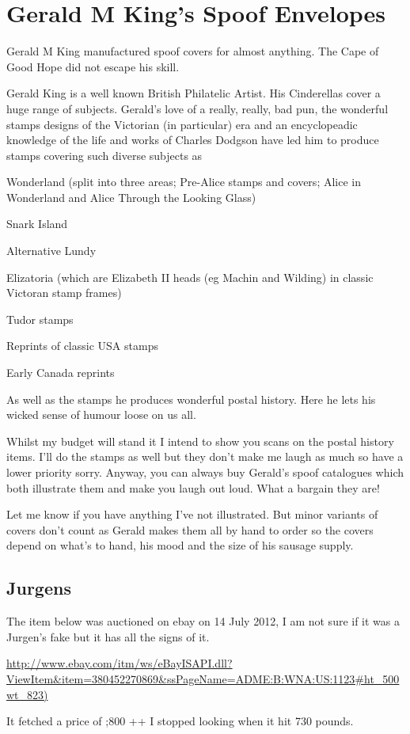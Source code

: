 \chapter{Gerald M King's Spoof Envelopes}

Gerald M King manufactured spoof covers for almost anything. 
The Cape of Good Hope did not escape his skill.


Gerald King is a well known British Philatelic Artist.  His Cinderellas 
cover a huge range of subjects.  Gerald's love of a really, 
really, bad pun, the wonderful stamps designs of the Victorian 
(in particular) era and an encyclopeadic knowledge of the life
and works of Charles Dodgson have led him to produce stamps 
covering such diverse subjects as

Wonderland (split into three areas; Pre-Alice stamps and covers; 
Alice in Wonderland and Alice Through the Looking Glass)

Snark Island

Alternative Lundy

Elizatoria (which are Elizabeth II heads (eg Machin and Wilding) in classic Victoran stamp frames)

Tudor stamps

Reprints of classic USA stamps

Early Canada reprints

As well as the stamps he produces wonderful postal history.  Here he lets 
his wicked sense of humour loose on us all.

Whilst my budget will stand it I intend to show you scans on the 
postal history items.  I'll do the stamps as well but they don't 
make me laugh as much so have a lower priority  sorry.  Anyway, you 
can always buy Gerald's spoof catalogues which both illustrate them 
and make you laugh out loud.  What a bargain they are!

Let me know if you have anything I've not illustrated.  But minor 
variants of covers don't count as Gerald makes them all by hand to 
order so the covers depend on what's to hand, his mood and the size 
of his sausage supply.

\section{Jurgens}
The item below was auctioned on ebay on 14 July 2012, I am not sure 
if it was a Jurgen's fake but it has all the signs of it. 

\url{http://www.ebay.com/itm/ws/eBayISAPI.dll?ViewItem&item=380452270869&ssPageName=ADME:B:WNA:US:1123\#ht_500wt_823)}

It fetched a price of \pound;800 ++ I stopped looking when it hit 730 pounds.


                                             